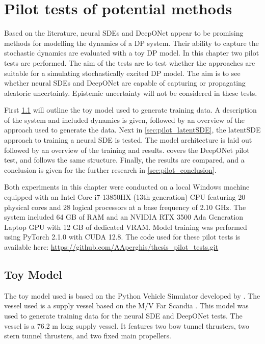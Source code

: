 \chapter{Pilot tests of potential methods}
\label{chapter:pilot_tests}
Based on the literature, neural SDEs and DeepONet appear to be promising methods for modelling the dynamics of a DP
system. Their ability to capture the stochastic dynamics are evaluated with a toy DP model. In this chapter two pilot
tests are performed. The aim of the tests are to test whether the approaches are suitable for a simulating
stochastically excited DP model. The aim is to see whether neural SDEs and DeepONet are capable of capturing or
propagating aleatoric uncertainty. Epistemic uncertainty will not be considered in these tests. 

First \cref{sec:toy_model} will outline the toy model used to generate training data. A description of the system and
included dynamics is given, followed by an overview of the approach used to generate the data. Next in
\cref{sec:pilot_latentSDE}, the latentSDE approach to training a neural SDE is tested. The model architecture is laid
out followed by an overview of the training and results.  covers the DeepONet pilot test, and
follows the same structure. Finally, the results are compared, and a conclusion is given for the further research in \cref{sec:pilot_conclusion}.

Both experiments in this chapter were conducted on a local Windows machine equipped with an Intel Core i7-13850HX (13th
generation) CPU featuring 20 physical cores and 28 logical processors at a base frequency of 2.10 GHz. The system
included 64 GB of RAM and an NVIDIA RTX 3500 Ada Generation Laptop GPU with 12 GB of dedicated VRAM. Model training was
performed using PyTorch 2.1.0 with CUDA 12.8. The code used for these pilot tests is available here: \url{https://github.com/AAperghis/thesis_pilot_tests.git}

\section{Toy Model}
\label{sec:toy_model}
The toy model used is based on the Python Vehicle Simulator developed by \textcite{FossenPythonVehicleSimulator2021}.
The vessel used is a supply vessel based on the M/V Far Scandia
\parencite{fossenIdentificationDynamicallyPositioned1996}. This model was used to generate training data for the neural
SDE and DeepONet tests. The vessel is a 76.2 m long supply vessel. It features two bow tunnel thrusters, two stern tunnel
thrusters, and two fixed main propellers. 

